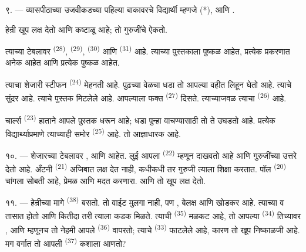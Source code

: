 \VUsaut{2.4mm}

\VUsaut{3.0mm}

९. --- व्यासपीठाच्या उजवीकडच्या पहिल्या बाकावरचे विद्यार्थी म्हणजे
 (*),  आणि .

हेन्री खूप लक्ष देतो आणि कष्टाळू आहे; तो गुरुजींचे ऐकतो.

त्याच्या टेबलावर  \textsuperscript{(28)}, 
\textsuperscript{(29)},  \textsuperscript{(30)} आणि
 \textsuperscript{(31)} आहे. त्याच्या पुस्तकाला पुष्कळ
 आहेत, प्रत्येक प्रकरणात अनेक  आहेत आणि प्रत्येक
 पुष्कळ  आहेत.

त्याचा शेजारी स्टीफन \textsuperscript{(24)} मेहनती आहे. पुढच्या वेळचा धडा तो
आपल्या वहीत लिहून घेतो आहे. त्याचे  सुंदर आहे. त्याचे पुस्तक
मिटलेले आहे. आपल्याला फक्त  \textsuperscript{(27)} दिसते.
त्याच्याजवळ त्याचा  \textsuperscript{(26)} आहे.

चार्ल्स \textsuperscript{(23)} हाताने आपले पुस्तक धरून आहे; धडा पुन्हा वाचण्यासाठी
तो ते उघडतो आहे. प्रत्येक विद्यार्थ्याप्रमाणे त्याच्याही समोर 
\textsuperscript{(25)} आहे. तो आज्ञाधारक आहे.

१०. --- शेजारच्या टेबलावर ,  आणि  आहेत. लुई
आपला  \textsuperscript{(22)} म्हणून दाखवतो आहे आणि गुरुजींच्या
 उत्तरे देतो आहे. अँटनी \textsuperscript{(21)} अजिबात लक्ष देत
नाही, कधीकधी तर गुरुजी त्याला शिक्षा करतात. पॉल \textsuperscript{(20)} चांगला
सोबती आहे, प्रेमळ आणि मदत करणारा. आणि तो खूप लक्ष देतो.

\VUsaut{4.2mm}
\VUsaut{3.2mm}

११. --- हेन्रीच्या मागे  \textsuperscript{(38)} बसतो. तो वाईट मुलगा
नाही, पण , बेलक्ष आणि खोडकर आहे. त्याच्या  व
 तासात  होतो आणि कितीदा तरी त्याला कडक
 मिळते. त्याची  \textsuperscript{(35)} मळकट आहे, तो
आपल्या  \textsuperscript{(34)} तिच्यावर , आणि
म्हणूनच तो नेहमी आपले  \textsuperscript{(36)} वापरतो; त्याचे
 \textsuperscript{(33)} फाटलेले आहे, कारण तो खूप निष्काळजी आहे. मग
 वर्गात तो आपली  \textsuperscript{(37)}
कशाला आणतो?

